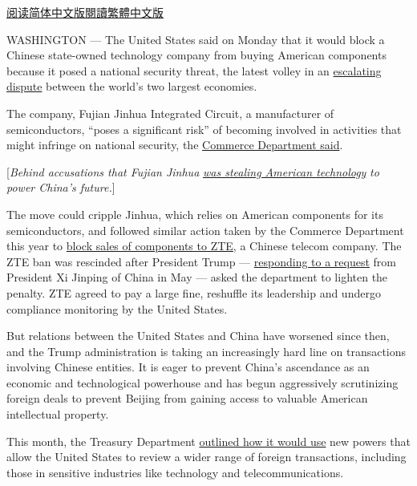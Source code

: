 \href{https://cn.nytimes.com/usa/20181030/fujian-jinhua-china-sales/}{阅读简体中文版}\href{https://cn.nytimes.com/usa/20181030/fujian-jinhua-china-sales/zh-hant/}{閱讀繁體中文版}

WASHINGTON --- The United States said on Monday that it would block a
Chinese state-owned technology company from buying American components
because it posed a national security threat, the latest volley in an
\href{https://www.nytimes.com/2018/09/19/us/politics/trump-china-trade-war.html}{escalating
dispute} between the world's two largest economies.

The company, Fujian Jinhua Integrated Circuit, a manufacturer of
semiconductors, ``poses a significant risk'' of becoming involved in
activities that might infringe on national security, the
\href{https://www.commerce.gov/news/press-releases/2018/10/addition-fujian-jinhua-integrated-circuit-company-ltd-jinhua-entity-list}{Commerce
Department said}.

{[}\emph{Behind accusations that Fujian Jinhua}
\href{https://www.nytimes.com/2018/06/22/technology/china-micron-chips-theft.html}{\emph{was
stealing American technology}} \emph{to power China's future.}{]}

The move could cripple Jinhua, which relies on American components for
its semiconductors, and followed similar action taken by the Commerce
Department this year to
\href{https://www.nytimes.com/2018/04/16/technology/chinese-tech-company-blocked-from-buying-american-components.html?module=inline}{block
sales of components to ZTE}, a Chinese telecom company. The ZTE ban was
rescinded after President Trump ---
\href{https://www.nytimes.com/2018/05/13/business/trump-vows-to-save-jobs-at-chinas-zte-lost-after-us-sanctions.html}{responding
to a request} from President Xi Jinping of China in May --- asked the
department to lighten the penalty. ZTE agreed to pay a large fine,
reshuffle its leadership and undergo compliance monitoring by the United
States.

But relations between the United States and China have worsened since
then, and the Trump administration is taking an increasingly hard line
on transactions involving Chinese entities. It is eager to prevent
China's ascendance as an economic and technological powerhouse and has
begun aggressively scrutinizing foreign deals to prevent Beijing from
gaining access to valuable American intellectual property.

This month, the Treasury Department
\href{https://www.nytimes.com/2018/10/10/business/us-china-investment-cfius.html}{outlined
how it would use} new powers that allow the United States to review a
wider range of foreign transactions, including those in sensitive
industries like technology and telecommunications.

